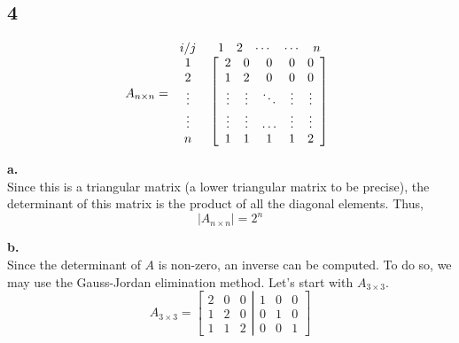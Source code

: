 \documentclass[10pt, twocolumn]{article}
\begin{document}
\subsection*{4}
\[A_{n\times n} = \begin{array}{*{20}{c}}
  {{i \mathord{\left/
 {\vphantom {i j}} \right.
 \kern-\nulldelimiterspace} j}}&{\begin{array}{*{20}{c}}
  1&2& \cdots & \cdots &n 
\end{array}} \\ 
  {\begin{array}{*{20}{c}}
  1 \\ 
  2 \\ 
   \vdots  \\ 
   \vdots  \\ 
  n 
\end{array}}&{\left[ {\begin{array}{*{20}{c}}
  2&0&0&0&0 \\ 
  1&2&0&0&0 \\ 
   \vdots & \vdots & \ddots & \vdots & \vdots  \\ 
   \vdots & \vdots & \ldots & \vdots & \vdots  \\ 
  1&1&1&1&2 
\end{array}} \right]} 
\end{array}\]


\textbf{a.\\[0.25cm]}
Since this is a triangular matrix (a lower triangular matrix to be precise), the determinant of this matrix is the product of all the diagonal elements. Thus, \[\left| A_{n\times n} \right| = {2^n}\]

\textbf{b. \\[0.25cm]}
Since the determinant of $A$ is non-zero, an inverse can be computed. To do so, we may use the Gauss-Jordan elimination method. Let's start with  $A_{3\times 3}$.
\[{A_{3 \times 3}} = \left[ {\left. {\begin{array}{*{20}{c}}
  2&0&0 \\ 
  1&2&0 \\ 
  1&1&2 
\end{array}} \right|\begin{array}{*{20}{c}}
  1&0&0 \\ 
  0&1&0 \\ 
  0&0&1 
\end{array}} \right]\]
\end{document}
